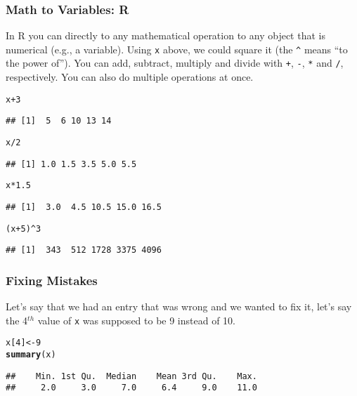 \documentclass[11pt,containsverbatim,handout]{beamer}
\makeatletter
\newcommand{\hlnum}[1]{\textcolor[rgb]{0.686,0.059,0.569}{#1}}%
\newcommand{\hlopt}[1]{\textcolor[rgb]{0,0,0}{#1}}%
\newcommand{\hlstd}[1]{\textcolor[rgb]{0.345,0.345,0.345}{#1}}%
\newcommand{\hlkwb}[1]{\textcolor[rgb]{0.69,0.353,0.396}{#1}}%
\newcommand{\hlkwd}[1]{\textcolor[rgb]{0.737,0.353,0.396}{\textbf{#1}}}%
\newenvironment{kframe}{%
 \def\at@end@of@kframe{}%
 \ifinner\ifhmode%
  \def\at@end@of@kframe{\end{minipage}}%
  \begin{minipage}{\columnwidth}%
 \fi\fi%
 \def\FrameCommand##1{\hskip\@totalleftmargin \hskip-\fboxsep
 \colorbox{shadecolor}{##1}\hskip-\fboxsep
     \hskip-\linewidth \hskip-\@totalleftmargin \hskip\columnwidth}%
 \MakeFramed {\advance\hsize-\width
   \@totalleftmargin\z@ \linewidth\hsize
   \@setminipage}}%
 {\par\unskip\endMakeFramed%
 \at@end@of@kframe}
\newenvironment{knitrout}{}{} %
\makeatother
\begin{document}
\begin{frame}[fragile]

\frametitle{Math to Variables: R}

In R you can directly to any mathematical operation to any object that is numerical (e.g., a variable).  Using \verb"x" above, we could square it (the \verb"^" means ``to the power of'').  You can add, subtract, multiply and divide with \verb"+", \verb"-", \verb"*" and \verb"/", respectively.  You can also do multiple operations at once. 
\begin{scriptsize}
\begin{knitrout}
\color{fgcolor}\begin{kframe}
\begin{alltt}
\hlstd{x} \hlopt{+} \hlnum{3}
\end{alltt}
\begin{verbatim}
## [1]  5  6 10 13 14
\end{verbatim}
\begin{alltt}
\hlstd{x}\hlopt{/}\hlnum{2}
\end{alltt}
\begin{verbatim}
## [1] 1.0 1.5 3.5 5.0 5.5
\end{verbatim}
\begin{alltt}
\hlstd{x}\hlopt{*}\hlnum{1.5}
\end{alltt}
\begin{verbatim}
## [1]  3.0  4.5 10.5 15.0 16.5
\end{verbatim}
\begin{alltt}
\hlstd{(x}\hlopt{+}\hlnum{5}\hlstd{)}\hlopt{^}\hlnum{3}
\end{alltt}
\begin{verbatim}
## [1]  343  512 1728 3375 4096
\end{verbatim}
\end{kframe}
\end{knitrout}
\end{scriptsize}
\end{frame}

\begin{frame}[fragile]

\frametitle{Fixing Mistakes}

Let's say that we had an entry that was wrong and we wanted to fix it, let's say the 4$^{th}$ value of \verb"x" was supposed to be 9 instead of 10.  

\begin{knitrout}
\color{fgcolor}\begin{kframe}
\begin{alltt}
\hlstd{x[}\hlnum{4}\hlstd{]} \hlkwb{<-} \hlnum{9}
\hlkwd{summary}\hlstd{(x)}
\end{alltt}
\begin{verbatim}
##    Min. 1st Qu.  Median    Mean 3rd Qu.    Max. 
##     2.0     3.0     7.0     6.4     9.0    11.0
\end{verbatim}
\end{kframe}
\end{knitrout}

\end{frame}
\end{document}
